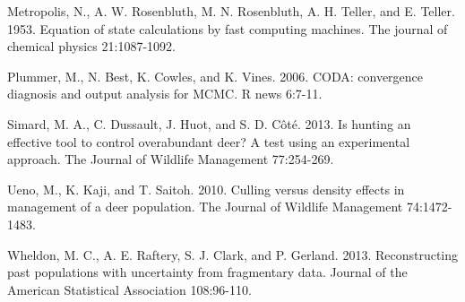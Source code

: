 \documentclass[]{article}
\begin{document}
Metropolis, N., A. W. Rosenbluth, M. N. Rosenbluth, A. H. Teller, and E. Teller. 1953. Equation of state calculations by fast computing machines. The journal of chemical physics 21:1087-1092.

Plummer, M., N. Best, K. Cowles, and K. Vines. 2006. CODA: convergence diagnosis and output analysis for MCMC. R news 6:7-11.

Simard, M. A., C. Dussault, J. Huot, and S. D. Côté. 2013. Is hunting an effective tool to control overabundant deer? A test using an experimental approach. The Journal of Wildlife Management 77:254-269.

Ueno, M., K. Kaji, and T. Saitoh. 2010. Culling versus density effects in management of a deer population. The Journal of Wildlife Management 74:1472-1483.

Wheldon, M. C., A. E. Raftery, S. J. Clark, and P. Gerland. 2013. Reconstructing past populations with uncertainty from fragmentary data. Journal of the American Statistical Association 108:96-110.
\end{document}
